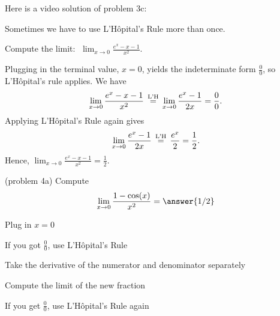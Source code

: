 \documentclass[handout]{ximera}
\begin{document}
Here is a video solution of  problem 3c:
\begin{foldable}
\end{foldable}

Sometimes we have to use L'H\^{o}pital's Rule more than once.

\begin{example}[example 4]
Compute the limit:  $\displaystyle{\;\lim_{x \to 0} \frac{e^x - x - 1}{x^2}}.$

Plugging in the terminal value, $x=0$, yields 
the indeterminate form $\frac00$, so L'H\^{o}pital's rule applies.
We have 
\[\lim_{x \to 0} \frac{e^x - x - 1}{x^2} \,\overset{\scriptsize\text{L'H}}{=}\, \lim_{x \to 0} \frac{e^x -1}{2x} = \frac{0}{0}.\]
Applying L'H\^{o}pital's Rule again gives
\[\lim_{x \to 0} \frac{e^x -1}{2x} \,\overset{\scriptsize\text{L'H}}{=}\, \frac{e^x}{2} = \frac{1}{2}.\]
Hence, $\displaystyle{\lim_{x \to 0} \frac{e^x - x - 1}{x^2} = \frac 12}.$
\end{example}


\begin{problem}(problem 4a)
  Compute
  \[
  \lim_{x \to 0} \frac{1 - \cos(x)}{x^2} = \answer{1/2}
  \]
  
    \begin{hint}
      Plug in $x=0$
    \end{hint}
    \begin{hint}
      If you got $\frac00$, use L'H\^{o}pital's Rule
    \end{hint}
    \begin{hint}
      Take the derivative of the numerator and denominator separately
    \end{hint}
	  \begin{hint}
      Compute the limit of the new fraction
    \end{hint}
		\begin{hint}
		 If you get $\frac00$, use L'H\^{o}pital's Rule again
    \end{hint}

	
\end{problem}
\end{document}
